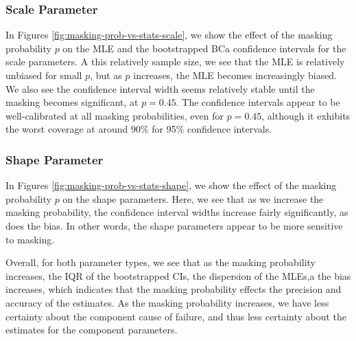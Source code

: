 \documentclass[
]{article}
\begin{document}
\hypertarget{scale-parameter}{%
\subsubsection*{Scale Parameter}\label{scale-parameter}}

In Figures \ref{fig:masking-prob-vs-stats-scale}, we show the effect of
the masking probability \(p\) on the MLE and the bootstrapped BCa
confidence intervals for the scale parameters. A this relatively sample
size, we see that the MLE is relatively unbiased for small \(p\), but as
\(p\) increases, the MLE becomes increasingly biased. We also see the
confidence interval width seems relatively stable until the masking
becomes significant, at \(p = 0.45\). The confidence intervals appear to
be well-calibrated at all masking probabilities, even for \(p = 0.45\),
although it exhibits the worst coverage at around \(90\%\) for 95\%
confidence intervals.

\hypertarget{shape-parameter}{%
\subsubsection*{Shape Parameter}\label{shape-parameter}}

In Figures \ref{fig:masking-prob-vs-stats-shape}, we show the effect of
the masking probability \(p\) on the shape parameters. Here, we see that
as we increase the masking probability, the confidence interval widths
increase fairly significantly, as does the bias. In other words, the
shape parameters appear to be more sensitive to masking.

Overall, for both parameter types, we see that as the masking
probability increases, the IQR of the bootstrapped CIs, the dispersion
of the MLEs,a the bias increases, which indicates that the masking
probability effects the precision and accuracy of the estimates. As the
masking probability increases, we have less certainty about the
component cause of failure, and thus less certainty about the estimates
for the component parameters.
\end{document}
